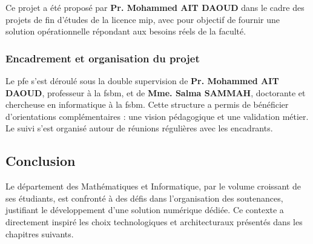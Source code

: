 Ce projet a été proposé par \textbf{Pr. Mohammed AIT DAOUD} dans le cadre des projets de fin d'études de la licence \acrshort{mip}, avec pour objectif de fournir une solution opérationnelle répondant aux besoins réels de la faculté.

\subsubsection{Encadrement et organisation du projet}
\label{ch1:encadrement}

Le \acrshort{pfe} s'est déroulé sous la double supervision de \textbf{Pr. Mohammed AIT DAOUD}, professeur à la \acrshort{fsbm}, et de \textbf{Mme. Salma SAMMAH}, doctorante et chercheuse en informatique à la \acrshort{fsbm}. Cette structure a permis de bénéficier d'orientations complémentaires : une vision pédagogique et une validation métier. Le suivi s'est organisé autour de réunions régulières avec les encadrants.

\subsection{Conclusion}
\label{ch1:conclusion}

Le département des Mathématiques et Informatique, par le volume croissant de ses étudiants, est confronté à des défis dans l'organisation des soutenances, justifiant le développement d'une solution numérique dédiée. Ce contexte a directement inspiré les choix technologiques et architecturaux présentés dans les chapitres suivants.
